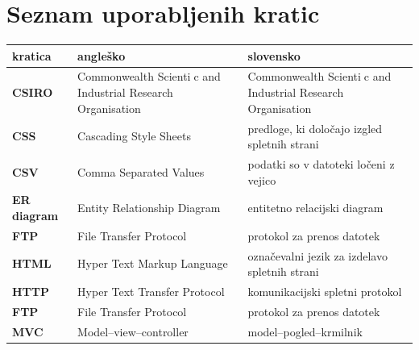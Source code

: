 \documentclass[a4paper, 12pt]{book}
\newcommand{\clearemptydoublepage}{\newpage{\pagestyle{empty}\cleardoublepage}}
\begin{document}
\clearemptydoublepage


\pagestyle{empty}
\def\thepage{}%
\tableofcontents{}


\clearemptydoublepage


\chapter*{Seznam uporabljenih kratic}  %
\noindent\begin{tabular}{p{}|p{}|p{}}    %
  {\bf kratica} & {\bf angleško}                             & {\bf slovensko} \\ \hline
  {\bf CSIRO} & Commonwealth Scientic and Industrial Research Organisation & Commonwealth Scientic and Industrial Research Organisation \\
  {\bf CSS} & Cascading Style Sheets & predloge, ki določajo izgled spletnih strani \\
  {\bf CSV} & Comma Separated Values & podatki so v datoteki ločeni z vejico \\
  {\bf ER diagram} & Entity Relationship Diagram & entitetno relacijski diagram \\
  {\bf FTP} & File Transfer Protocol & protokol za prenos datotek \\
  {\bf HTML} & Hyper Text Markup Language & označevalni jezik za izdelavo spletnih strani \\
  {\bf HTTP} & Hyper Text Transfer Protocol & komunikacijski spletni protokol \\
  {\bf FTP} & File Transfer Protocol & protokol za prenos datotek \\
  {\bf MVC} & Model--view--controller & model--pogled--krmilnik \\

\end{tabular}
\end{document}
